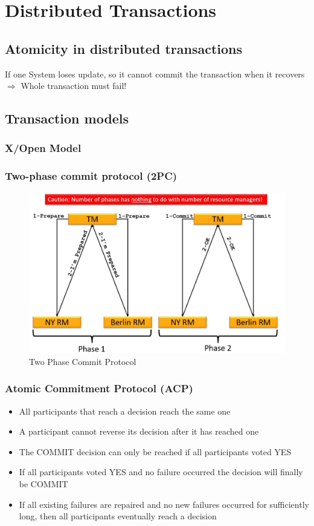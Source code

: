 			
	\section{Distributed Transactions}
	
		\subsection{Atomicity in distributed transactions}
			If one System loses update, so it cannot commit the transaction when it recovers $ \Rightarrow $ Whole transaction must fail!
		\subsection{Transaction models}
			\subsubsection{X/Open Model}
			
			\subsubsection{Two-phase commit protocol (2PC)}
				\begin{figure}[h!]
					\includegraphics[scale=0.3]{res/two_phase_commit_protocol.jpg}
					\caption{Two Phase Commit Protocol}
				\end{figure}
			
			\subsubsection{Atomic Commitment Protocol (ACP)}
				\begin{itemize}
				 \item All participants that reach a decision reach the same one
				 \item A participant cannot reverse its decision after it has reached one 
				 \item The COMMIT decision can only be reached if all participants voted YES 
				 \item  If all participants voted YES and no failure occurred the decision will finally be COMMIT 
				 \item If all existing failures are repaired and no new failures occurred for sufficiently long, then all participants eventually reach a decision 
			\end{itemize}
			
